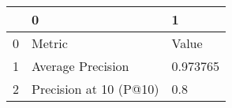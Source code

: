 \begin{tabular}{lll}
\toprule
{} &                       0 &         1 \\
\midrule
0 &                  Metric &     Value \\
1 &       Average Precision &  0.973765 \\
2 &  Precision at 10 (P@10) &       0.8 \\
\bottomrule
\end{tabular}
